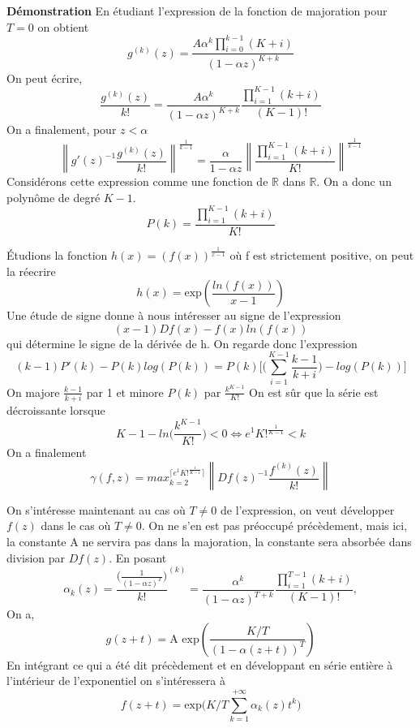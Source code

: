 \documentclass[a4paper,10.5pt]{article}
\begin{document}
	\noindent\textbf{Démonstration}
	\noindent En étudiant l'expression de la fonction de majoration pour $T=0$ on obtient
	\[g^{(k)}(z)=\frac{A\alpha^{k}\prod_{i=0}^{k-1}(K+i)}{(1-\alpha z)^{K+k}}\]
	On peut écrire,
	\[\frac{g^{(k)}(z)}{k!}=\frac{A\alpha^{k}}{(1-\alpha z)^{K+k}} \frac{\prod_{i=1}^{K-1}(k+i)}{(K-1)!} \]
	On a finalement, pour $z < \alpha$ 
	\[\left\|g'(z)^{-1}\frac{g^{(k)}(z)}{k!}\right\|^{\frac{1}{k-1}}= \frac{\alpha}{1-\alpha z} \left\|\frac{\prod_{i=1}^{K-1}(k+i)}{K!}\right\|^{\frac{1}{k-1}} \tag{*}\]
	Considérons cette expression comme une fonction de $\mathbb{R}$ dans $\mathbb{R}$. On a donc un polynôme de degré $K-1$.
	\[P(k)=\frac{\prod_{i=1}^{K-1}(k+i)}{K!}\]
	
	
	\noindent Étudions la fonction $h(x)=(f(x))^{\frac{1}{x-1}}$ où f est strictement positive, on peut la réecrire
	\[h(x)=\text{exp}(\frac{ln(f(x))}{x-1}) \]
	Une étude de signe donne à nous intéresser au signe de l'expression
	\[(x-1)Df(x)-f(x)ln(f(x)) \tag{1}\] 
	qui détermine le signe de la dérivée de h. On regarde donc l'expression 
	\[(k-1)P'(k)-P(k)log(P(k))=P(k)\Big[\big(\sum_{i=1}^{K-1}\frac{k-1}{k+i}\big)-log(P(k))\Big]\]
	On majore $\frac{k-1}{k+i}$ par 1 et minore $P(k)$ par $\frac{k^{K-1}}{K!}$ On est sûr que la série est décroissante lorsque 
	\[K-1-ln\big(\frac{k^{K-1}}{K!}\big)<0 \Longleftrightarrow e^{1}K!^{\frac{1}{K-1}}< k\]
	On a finalement 
	\[\gamma(f,z)=max_{k=2}^{\lceil e^{1}K!^{\frac{1}{K-1}} \rceil}\left\|Df(z)^{-1}\frac{f^{(k)}(z)}{k!}\right\| \]
	
	\vspace{1cm} 
	
	On s'intéresse maintenant au cas où $T\neq 0$ de l'expression, on veut développer $f(z)$ dans le cas où $T \neq 0$. On ne s'en est pas préoccupé précèdement, mais ici, la constante A ne servira pas dans la majoration, la constante sera absorbée dans division par $Df(z)$. En posant \[\alpha_{k}(z)=\frac{\big(\frac{1}{(1-\alpha z)^{T}}\big)}{k!}^{(k)}=\frac{\alpha^{k}}{(1-\alpha z)^{T+k}} \frac{\prod_{i=1}^{T-1}(k+i)}{(K-1)!},\] On a,
	\[g(z+t)=\text{A exp}(\frac{K/T}{(1-\alpha (z+t))^{T}})\]
	En intégrant ce qui a été dit précèdement et en développant en série entière à l'intérieur de l'exponentiel on s'intéressera à
	\[f(z+t)=\text{exp}\Big(K/T \sum_{k=1}^{+\infty}\alpha_{k}(z)t^{k} \Big)\]
	
\end{document}
